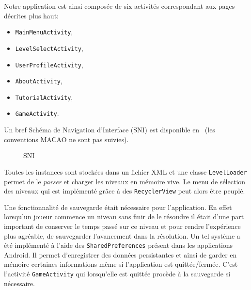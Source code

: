 \documentclass[../main.tex]{subfiles}
\begin{document}
Notre application est ainsi composée de six activités correspondant aux pages décrites plus haut: 
\begin{itemize}
    \item \texttt{MainMenuActivity},
    \item \texttt{LevelSelectActivity},
    \item \texttt{UserProfileActivity},
    \item \texttt{AboutActivity},
    \item \texttt{TutorialActivity},
    \item \texttt{GameActivity}.
\end{itemize}
Un bref Schéma de Navigation d'Interface (SNI) est disponible en~ (les conventions MACAO ne sont pas suivies).
\begin{figure}[ht!]
\caption{SNI}
\label{fig-sni}
\end{figure}

Toutes les instances sont stockées dans un fichier XML et une classe \texttt{LevelLoader} permet de le \textit{parser} et charger les niveaux en mémoire vive. Le menu de sélection des niveaux qui est implémenté grâce à des \texttt{RecyclerView} peut alors être peuplé.

Une fonctionnalité de sauvegarde était nécessaire pour l'application. En effet lorsqu'un joueur commence un niveau sans finir de le résoudre il était d'une part important de conserver le temps passé sur ce niveau et pour rendre l'expérience plus agréable, de sauvegarder l'avancement dans la résolution. Un tel système a été implémenté à l'aide des \texttt{SharedPreferences} présent dans les applications Android. Il permet d'enregistrer des données persistantes et ainsi de garder en mémoire certaines informations même si l'application est quittée/fermée. C'est l'activité \texttt{GameActivity} qui lorsqu'elle est quittée procède à la sauvegarde si nécessaire.
\end{document}
